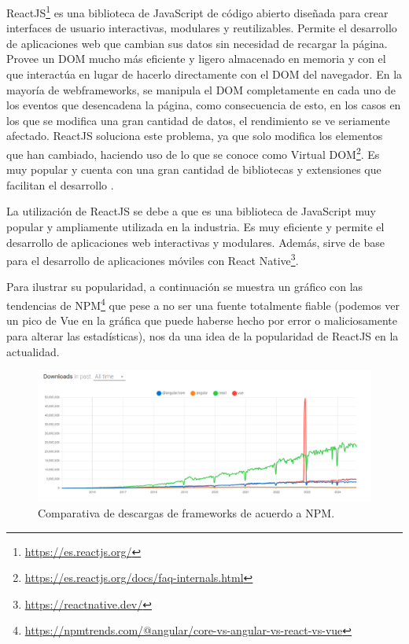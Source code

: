ReactJS\footnote{\url{https://es.reactjs.org/}} es una biblioteca de JavaScript de código abierto diseñada para crear interfaces de usuario interactivas, modulares y reutilizables. Permite el desarrollo de aplicaciones web que cambian sus datos sin necesidad de recargar la página. Provee un DOM mucho más eficiente y ligero almacenado en memoria y con el que interactúa en lugar de hacerlo directamente con el DOM del navegador. En la mayoría de webframeworks, se manipula el DOM completamente en cada uno de los eventos que desencadena la página, como consecuencia de esto, en los casos en los que se modifica una gran cantidad de datos, el rendimiento se ve seriamente afectado. ReactJS soluciona este problema, ya que solo modifica los elementos que han cambiado, haciendo uso de lo que se conoce como Virtual DOM\footnote{\url{https://es.reactjs.org/docs/faq-internals.html}}. Es muy popular y cuenta con una gran cantidad de bibliotecas y extensiones que facilitan el desarrollo \cite{aggarwal2018modern}.\newline

La utilización de ReactJS se debe a que es una biblioteca de JavaScript muy popular y ampliamente utilizada en la industria. Es muy eficiente y permite el desarrollo de aplicaciones web interactivas y modulares. Además, sirve de base para el desarrollo de aplicaciones móviles con React Native\footnote{\url{https://reactnative.dev/}}.\newline

Para ilustrar su popularidad, a continuación se muestra un gráfico con las tendencias de NPM\footnote{\url{https://npmtrends.com/@angular/core-vs-angular-vs-react-vs-vue}} que pese a no ser una fuente totalmente fiable (podemos ver un pico de Vue en la gráfica que puede haberse hecho por error o maliciosamente para alterar las estadísticas), nos da una idea de la popularidad de ReactJS en la actualidad.

\begin{figure}[H]
    \centering
    \includegraphics[width=1\textwidth]{./imagenes/Comparativa.png}
    \caption{Comparativa de descargas de frameworks de acuerdo a NPM.}
\end{figure}

